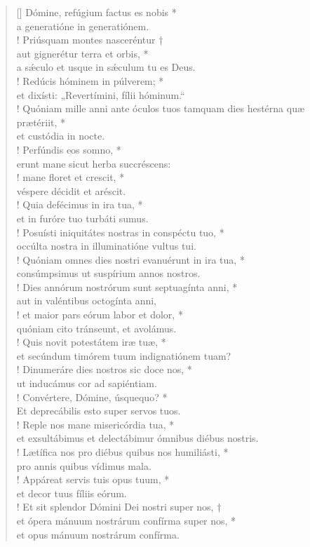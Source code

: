 \begin{verse}[\versewidth]
Dómine, refúgium factus es nobis *\\
a generatióne in generatiónem.\\!
\vin Priúsquam montes nasceréntur †\\
\vin aut gignerétur terra et orbis, *\\
\vin a s\'{æ}culo et usque in s\'{æ}culum tu es Deus.\\!
Redúcis hóminem in púlverem; *\\
et dixísti: „Revertímini, fílii hóminum.“\\!
\vin Quóniam mille anni ante óculos tuos tamquam dies hestérna quæ prætériit, *\\
\vin et custódia in nocte.\\!
Perfúndis eos somno, *\\
erunt mane sicut herba succréscens:\\!
\vin mane floret et crescit, *\\
\vin véspere décidit et aréscit.\\!
Quia defécimus in ira tua, *\\
et in furóre tuo turbáti sumus.\\!
\vin Posuísti iniquitátes nostras in conspéctu tuo, *\\
\vin occúlta nostra in illuminatióne vultus tui.\\!
Quóniam omnes dies nostri evanuérunt in ira tua, *\\
consúmpsimus ut suspírium annos nostros.\\!
\vin Dies annórum nostrórum sunt septuagínta anni, *\\
\vin aut in valéntibus octogínta anni,\\!
et maior pars eórum labor et dolor, *\\
quóniam cito tránseunt, et avolámus.\\!
\vin Quis novit potestátem iræ tuæ, *\\
\vin et secúndum timórem tuum indignatiónem tuam?\\!
Dinumeráre dies nostros sic doce nos, *\\
ut inducámus cor ad sapiéntiam.\\!
\vin Convértere, Dómine, úsquequo? *\\
\vin Et deprecábilis esto super servos tuos.\\!
Reple nos mane misericórdia tua, *\\
et exsultábimus et delectábimur ómnibus diébus nostris.\\!
\vin Lætífica nos pro diébus quibus nos humiliásti, *\\
\vin pro annis quibus vídimus mala.\\!
Appáreat servis tuis opus tuum, *\\
et decor tuus fíliis eórum.\\!
\vin Et sit splendor Dómini Dei nostri super nos, †\\
\vin et ópera mánuum nostrárum confírma super nos, *\\
\vin et opus mánuum nostrárum confírma.\\
\end{verse}
\vspace{1cm}



